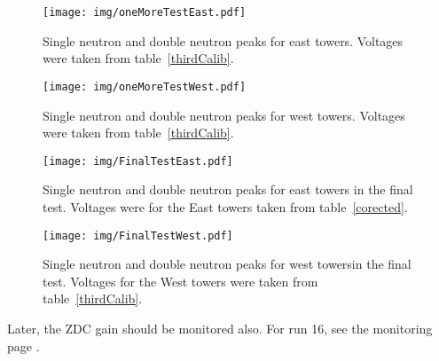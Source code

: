 \begin{figure}[htb]
\begin{center}
\texttt{[image: img/oneMoreTestEast.pdf]}
\end{center}
\caption{Single neutron and double neutron peaks for east towers.
Voltages were taken from table~\ref{thirdCalib}.}
\label{oneMoreTestEast}
\end{figure}

\begin{figure}[htb]
\begin{center}
\texttt{[image: img/oneMoreTestWest.pdf]}
\end{center}
\caption{Single neutron and double neutron peaks for west towers. 
Voltages were taken from table~\ref{thirdCalib}.}
\label{oneMoreTestWest}
\end{figure}

\begin{figure}[htb]
\begin{center}
\texttt{[image: img/FinalTestEast.pdf]}
\end{center}
\caption{Single neutron and double neutron peaks for east towers in the final test. Voltages were
for the East towers taken from table~\ref{corected}.}
\label{finalTestEast}
\end{figure}

\begin{figure}[htb]
\begin{center}
\texttt{[image: img/FinalTestWest.pdf]}
\end{center}
\caption{Single neutron and double neutron peaks for west towersin the final test. Voltages
for the West towers were taken from table~\ref{thirdCalib}.}
\label{finalTestWest}
\end{figure}

Later, the ZDC gain should be monitored also. For run 16, see the monitoring page \cite{ZDCmonPage}.